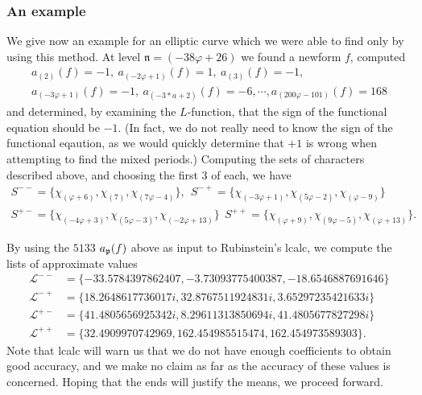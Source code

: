 \documentclass{amsart}
\newcommand{\n}{\mathfrak{n}}
\begin{document}
\subsubsection{An example}
We give now an example for an elliptic curve which we were able to find only by using
this method. At level $\n = (-38\varphi + 26)$ we found a newform $f$, computed
\begin{multline*}
    a_{(2)}(f) = -1,\  a_{(-2\varphi + 1)}(f) = 1,\  a_{(3)}(f) = -1, \\ 
    a_{(-3\varphi + 1)}(f) = -1,\  a_{(-3*a + 2)}(f) = -6, \cdots, a_{(200\varphi - 101)}(f) = 168
\end{multline*}
and determined, by examining the $L$-function, that the sign of the functional equation
should be $-1$. (In fact, we do not really need to know the sign of the functional eqaution,
as we would quickly determine that $+1$ is wrong when attempting to find the mixed periods.)
Computing the sets of characters described above, and choosing the first $3$ of each, we
have
\begin{multline*}
S^{--} = \{\chi_{(\varphi + 6)}, \chi_{(7)}, \chi_{(7\varphi - 4)}\}, \ \ 
    S^{-+} = \{\chi_{(-3\varphi + 1)}, \chi_{(5 \varphi - 2)}, \chi_{(\varphi - 9)}\} \\
S^{+-} = \{\chi_{(-4\varphi + 3)}, \chi_{(5\varphi - 3)}, \chi_{(-2\varphi + 13)} \} \ \ 
    S^{++} = \{\chi_{(\varphi + 9)}, \chi_{(9\varphi - 5)}, \chi_{(\varphi + 13)} \}.
\end{multline*}

By using the $5133$ $a_{\mathfrak{p}}(f)$ above as input to Rubinstein's lcalc, we compute the
lists of approximate values
\[
\begin{split}
\mathcal{L}^{--} &= \{-33.5784397862407, -3.73093775400387, -18.6546887691646 \} \\ 
\mathcal{L}^{-+} &= \{18.2648617736017i, 32.8767511924831i, 3.65297235421633i \} \\
\mathcal{L}^{+-} &= \{41.4805656925342i, 8.29611313850694i, 41.4805677827298i\} \\
\mathcal{L}^{++} &= \{32.4909970742969, 162.454985515474, 162.454973589303\}.
\end{split}
\]
Note that lcalc will warn us that we do not have enough coefficients to obtain good
accuracy, and we make no claim as far as the accuracy of these values is concerned.
Hoping that the ends will justify the means, we proceed forward.
\end{document}
